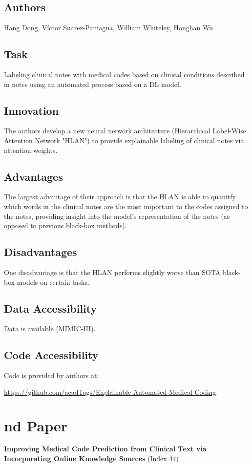 \documentclass[
	letterpaper, %
]{jdf}
\begin{document}
\subsection{Authors}
Hang Dong, Víctor Suarez-Paniagua, William Whiteley, Honghan Wu 
\subsection{Task}
Labeling clinical notes with medical codes based on clinical conditions described in notes using an automated process based on a DL model.
\subsection{Innovation}
The authors develop a new neural network architecture (Hierarchical Label-Wise Attention Network "HLAN") to provide explainable labeling of clinical notes via attention weights. 
\subsection{Advantages}
The largest advantage of their approach is that the HLAN is able to quanitfy which words in the clinical notes are the most important to the codes assigned to the notes, providing insight into the model's representation of the notes (as opposed to previous black-box methods).
\subsection{Disadvantages}
One disadvantage is that the HLAN performs slightly worse than SOTA black-box models on certain tasks. 
\subsection{Data Accessibility}
 Data is available (MIMIC-III).
\subsection{Code Accessibility}
Code is provided by authors at:

\href{https://github.com/acadTags/Explainable-Automated-Medical-Coding}{https://github.com/acadTags/Explainable-Automated-Medical-Coding}.

\section{nd Paper}
\textbf{Improving Medical Code Prediction from Clinical Text via Incorporating Online Knowledge Sources} (Index 44)
\end{document}
